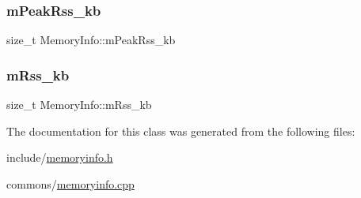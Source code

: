 \subsubsection{\texorpdfstring{mPeakRss\_kb}{mPeakRss\_kb}}
{\footnotesize\ttfamily size\+\_\+t Memory\+Info\+::m\+Peak\+Rss\+\_\+kb\hspace{0.3cm}{\ttfamily [protected]}}

\mbox{\label{class_memory_info_aace36f5e4912e28d170d343ba0b2c59a}} 
\subsubsection{\texorpdfstring{mRss\_kb}{mRss\_kb}}
{\footnotesize\ttfamily size\+\_\+t Memory\+Info\+::m\+Rss\+\_\+kb\hspace{0.3cm}{\ttfamily [protected]}}



The documentation for this class was generated from the following files\+:\begin{DoxyCompactItemize}
\item 
include/\mbox{\hyperlink{memoryinfo_8h}{memoryinfo.\+h}}\item 
commons/\mbox{\hyperlink{memoryinfo_8cpp}{memoryinfo.\+cpp}}\end{DoxyCompactItemize}
